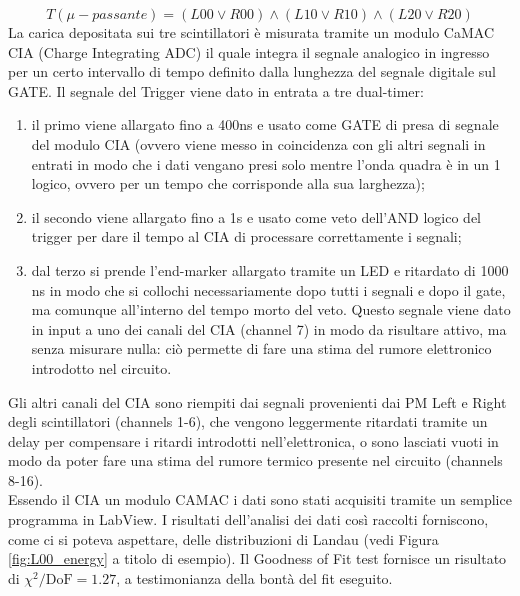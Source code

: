 \begin{equation}
T (\mu-passante)=(L00 \lor R00) \land (L10 \lor R10) \land (L20 \lor R20)
\end{equation}
La carica depositata sui tre scintillatori \`e misurata tramite un modulo CaMAC CIA (Charge Integrating ADC) il quale integra il segnale analogico in ingresso per un certo intervallo di tempo definito dalla lunghezza del segnale digitale sul GATE. Il segnale del Trigger viene dato in entrata a tre dual-timer:
\begin{enumerate}
	\item il primo viene allargato fino a 400ns e usato come GATE di presa di segnale del modulo CIA (ovvero viene messo in coincidenza con gli altri segnali in entrati in modo che i dati vengano presi solo mentre l'onda quadra \`e in un 1 logico, ovvero per un tempo che corrisponde alla sua larghezza);
	\item il secondo viene allargato fino a 1s e usato come veto dell'AND logico del trigger per dare il tempo al CIA di processare correttamente i segnali;
	\item dal terzo si prende l'end-marker allargato tramite un LED e ritardato di 1000 ns in modo che si collochi necessariamente dopo tutti i segnali e dopo il gate, ma comunque all'interno del tempo morto del veto. Questo segnale viene dato in input a uno dei canali del CIA (channel 7) in modo da risultare attivo, ma senza misurare nulla: ci\`o permette di fare una stima del rumore elettronico introdotto nel circuito.
\end{enumerate}

Gli altri canali del CIA sono riempiti dai segnali provenienti dai PM Left e Right degli scintillatori (channels 1-6), che vengono leggermente ritardati tramite un delay per compensare i ritardi introdotti nell'elettronica, o sono lasciati vuoti in modo da poter fare una stima del rumore termico presente nel circuito (channels 8-16).\\
Essendo il CIA un modulo CAMAC i dati sono stati acquisiti tramite un semplice programma in LabView. I risultati dell'analisi dei dati cos\`i raccolti forniscono, come ci si poteva aspettare, delle distribuzioni di Landau (vedi Figura \ref{fig:L00_energy} a titolo di esempio). Il Goodness of Fit test fornisce un risultato di $\chi^{2}/\text{DoF}=1.27$, a testimonianza della bont\`a del fit eseguito.


